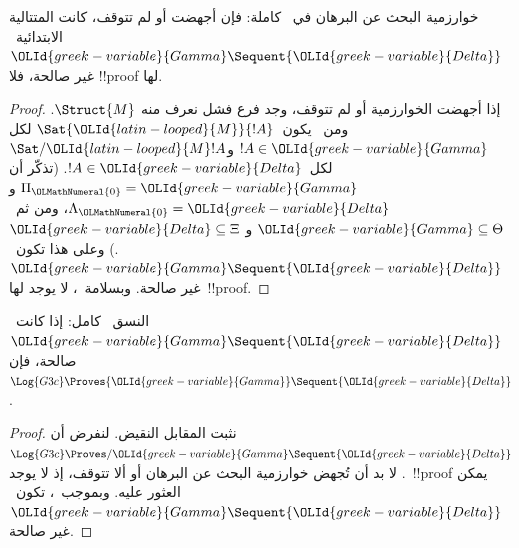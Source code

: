 \documentclass[../../../include/open-logic-section]{subfiles}
\begin{document}
\begin{cor}
خوارزمية البحث عن البرهان في~ كاملة: فإن أجهضت أو لم تتوقف،
كانت المتتالية الابتدائية~${\OLId{greek-variable}{Gamma}} \Sequent {\OLId{greek-variable}{Delta}}$ غير صالحة، فلا
!!{proof} لها.
\end{cor}

\begin{proof}
  إذا أجهضت الخوارزمية أو لم تتوقف، وجد فرع فشل نعرف منه
  $\Struct{M}$. ومن~ يكون~$\Sat{{\OLId{latin-looped}{M}}}{!A}$ لكل
  $!A\in{\OLId{greek-variable}{Gamma}}$ و$\Sat/{{\OLId{latin-looped}{M}}}{!A}$ لكل~$!A\in{\OLId{greek-variable}{Delta}}$. (تذكّر أن
  $\Pi_{\OLMathNumeral{0}}={\OLId{greek-variable}{Gamma}}$ و$\Lambda_{\OLMathNumeral{0}}={\OLId{greek-variable}{Delta}}$، ومن ثم~${\OLId{greek-variable}{Gamma}}\subseteq\Theta$ و
  ${\OLId{greek-variable}{Delta}}\subseteq\Xi$.) وعلى هذا تكون~${\OLId{greek-variable}{Gamma}} \Sequent {\OLId{greek-variable}{Delta}}$ غير صالحة.
  وبسلامة~، لا يوجد لها~!!{proof}.
\end{proof}

\begin{cor}
النسق~ كامل: إذا كانت~${\OLId{greek-variable}{Gamma}} \Sequent {\OLId{greek-variable}{Delta}}$ صالحة، فإن
$\Log{G3c}\Proves{\OLId{greek-variable}{Gamma}} \Sequent {\OLId{greek-variable}{Delta}}$.
\end{cor}

\begin{proof}
  نثبت المقابل النقيض. لنفرض أن
  $\Log{G3c}\Proves/{\OLId{greek-variable}{Gamma}} \Sequent {\OLId{greek-variable}{Delta}}$. لا بد أن تُجهض خوارزمية
  البحث عن البرهان أو ألا تتوقف، إذ لا يوجد~!!{proof} يمكن العثور عليه.
  وبموجب~، تكون~${\OLId{greek-variable}{Gamma}} \Sequent {\OLId{greek-variable}{Delta}}$ غير صالحة.
\end{proof}
\end{document}
